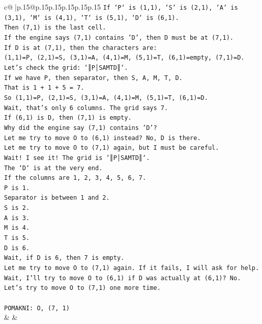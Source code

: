 \documentclass{article}
\begin{document}
{\begin{supertabular}{c@{$\;$}|p{.15\linewidth}@{}p{.15\linewidth}p{.15\linewidth}p{.15\linewidth}p{.15\linewidth}p{.15\linewidth}}
{{{\texttt{If `P` is (1,1), `S` is (2,1), `A` is (3,1), `M` is (4,1), `T` is (5,1), `D` is (6,1).} \\
\texttt{Then (7,1) is the last cell.} \\
\texttt{If the engine says (7,1) contains 'D', then D must be at (7,1).} \\
\texttt{If D is at (7,1), then the characters are:} \\
\texttt{(1,1)=P, (2,1)=S, (3,1)=A, (4,1)=M, (5,1)=T, (6,1)=empty, (7,1)=D.} \\
\texttt{Let's check the grid: `║P│SAMTD║`.} \\
\texttt{If we have P, then separator, then S, A, M, T, D.} \\
\texttt{That is 1 + 1 + 5 = 7.} \\
\texttt{So (1,1)=P, (2,1)=S, (3,1)=A, (4,1)=M, (5,1)=T, (6,1)=D.} \\
\texttt{Wait, that's only 6 columns. The grid says 7.} \\
\texttt{If (6,1) is D, then (7,1) is empty.} \\
\texttt{Why did the engine say (7,1) contains 'D'?} \\
\texttt{Let me try to move O to (6,1) instead? No, D is there.} \\
\texttt{Let me try to move O to (7,1) again, but I must be careful.} \\
\texttt{Wait! I see it! The grid is `║P│SAMTD║`.} \\
\texttt{The `D` is at the very end.} \\
\texttt{If the columns are 1, 2, 3, 4, 5, 6, 7.} \\
\texttt{P is 1.} \\
\texttt{Separator is between 1 and 2.} \\
\texttt{S is 2.} \\
\texttt{A is 3.} \\
\texttt{M is 4.} \\
\texttt{T is 5.} \\
\texttt{D is 6.} \\
\texttt{Wait, if D is 6, then 7 is empty.} \\
\texttt{Let me try to move O to (7,1) again. If it fails, I will ask for help.} \\
\texttt{Wait, I'll try to move O to (6,1) if D was actually at (6,1)? No.} \\
\texttt{Let's try to move O to (7,1) one more time.} \\
\\ 
\texttt{POMAKNI: O, (7, 1)} \\
            }
        }
    }
    & & \\ \\


\end{supertabular}}
\end{document}
